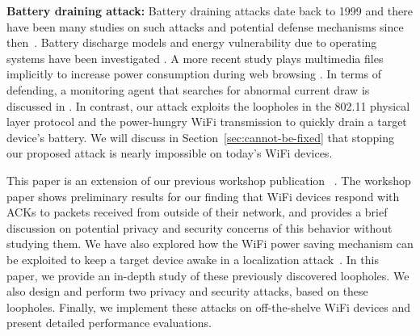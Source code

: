 \textbf{Battery draining attack:} 
Battery draining attacks date back to 1999 \cite{stajano1999resurrecting} and there have been many studies on such attacks and potential defense mechanisms since then~\cite{caviglione2012energy}.
Battery discharge models and energy vulnerability due to operating systems have been investigated \cite{zhang2010accurate,jindal2013hypnos}. A more recent study plays multimedia files implicitly to increase power consumption during web browsing \cite{fiore2014multimedia, fiore2017exploiting}. In terms of defending, a monitoring agent that searches for abnormal current draw is discussed in \cite{buennemeyer2008mobile}. In contrast, our attack exploits the loopholes in the 802.11 physical layer protocol and the power-hungry WiFi transmission to quickly drain a target device's battery. We will discuss in Section~\ref{sec:cannot-be-fixed} that stopping our proposed attack is nearly impossible on today's WiFi devices.


This paper is an extension of our previous workshop publication ~\cite{polite-wifi}. The workshop paper shows preliminary results for our finding that WiFi devices respond with ACKs to packets received from outside of their network, and provides a brief discussion on potential privacy and security concerns of this behavior without studying them. We have also explored how the WiFi power saving mechanism can be exploited to keep a target device awake in a localization attack~\cite{wi-peep}. 
In this paper, we provide an in-depth study of these previously discovered loopholes. We also design and perform two privacy and security attacks, based on these loopholes. Finally, we implement these attacks on off-the-shelve WiFi devices and present detailed performance evaluations.



